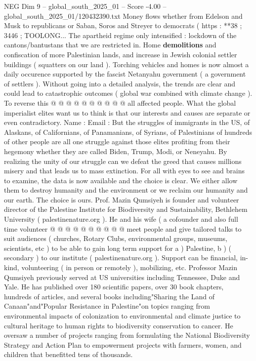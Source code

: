 \begin{textsample}{NEG Dim 9 – global\_south\_2025\_01 – Score -4.00 – global\_south\_2025\_01/120432390.txt}
Money flows whether from Edelson and Musk to republicans or Saban, Soros and Streyer to democrats ( https : **38 ; 3446 ; TOOLONG...
The apartheid regime only intensified : lockdown of the cantons/bantustans that we are restricted in.
Home \textbf{demolitions} and confiscation of more Palestinian lands, and increase in Jewish colonial settler buildings ( squatters on our land ).
Torching vehicles and homes is now almost a daily occurence supported by the fascist Netanyahu government ( a government of settlers ).
Without going into a detailed analysis, the trends are clear and could lead to catastrophic outcomes ( global war combined with climate change ).
To reverse this @ @ @ @ @ @ @ @ @ @ all affected people.
What the global imperialist elites want us to think is that our interests and causes are separate or even contradictory.
Name : Email : But the struggles of immigrants in the US, of Alaskans, of Californians, of Panamanians, of Syrians, of Palestinians of hundreds of other people are all one struggle against those elites profiting from their hegemony whether they are called Biden, Trump, Modi, or Neneyahu.
By realizing the unity of our struggle can we defeat the greed that causes millions misery and that leads us to mass extinction.
For all with eyes to see and brains to examine, the data is now available and the choice is clear.
We either allow them to destroy humanity and the environment or we reclaim our humanity and our earth.
The choice is ours.
Prof.
Mazin Qumsiyeh is founder and volunteer director of the Palestine Institute for Biodiversity and Sustainability, Bethlehem University ( palestinenature.org ).
He and his wife ( a cofounder and also full time volunteer @ @ @ @ @ @ @ @ @ @ meet people and give tailored talks to suit audiences ( churches, Rotary Clubs, environmental groups, museums, scientists, etc ) to be able to gain long term support for a ) Palestine, b ) ( secondary ) to our institute ( palestinenature.org ).
Support can be financial, in-kind, volunteering ( in person or remotely ), mobilizing, etc.
Professor Mazin Qumsiyeh previously served at US universities including Tennessee, Duke and Yale.
He has published over 180 scientific papers, over 30 book chapters, hundreds of articles, and several books including"Sharing the Land of Canaan"and"Popular Resistance in Palestine"on topics ranging from environmental impacts of colonization to environmental and climate justice to cultural heritage to human rights to biodiversity conservation to cancer.
He oversaw a number of projects ranging from formulating the National Biodiversity Strategy and Action Plan to empowerment projects with farmers, women, and children that benefitted tens of thousands.

\end{textsample}
